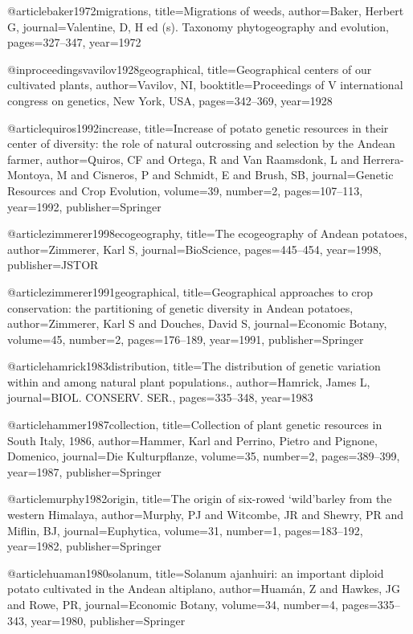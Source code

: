 {@article{baker1972migrations,
  title={Migrations of weeds},
  author={Baker, Herbert G},
  journal={Valentine, D, H ed (s). Taxonomy phytogeography and evolution},
  pages={327--347},
  year={1972}
}

@inproceedings{vavilov1928geographical,
  title={Geographical centers of our cultivated plants},
  author={Vavilov, NI},
  booktitle={Proceedings of V international congress on genetics, New York, USA},
  pages={342--369},
  year={1928}
}

@article{quiros1992increase,
  title={Increase of potato genetic resources in their center of diversity: the role of natural outcrossing and selection by the Andean farmer},
  author={Quiros, CF and Ortega, R and Van Raamsdonk, L and Herrera-Montoya, M and Cisneros, P and Schmidt, E and Brush, SB},
  journal={Genetic Resources and Crop Evolution},
  volume={39},
  number={2},
  pages={107--113},
  year={1992},
  publisher={Springer}
}

@article{zimmerer1998ecogeography,
  title={The ecogeography of Andean potatoes},
  author={Zimmerer, Karl S},
  journal={BioScience},
  pages={445--454},
  year={1998},
  publisher={JSTOR}
}

@article{zimmerer1991geographical,
  title={Geographical approaches to crop conservation: the partitioning of genetic diversity in Andean potatoes},
  author={Zimmerer, Karl S and Douches, David S},
  journal={Economic Botany},
  volume={45},
  number={2},
  pages={176--189},
  year={1991},
  publisher={Springer}
}

@article{hamrick1983distribution,
  title={The distribution of genetic variation within and among natural plant populations.},
  author={Hamrick, James L},
  journal={BIOL. CONSERV. SER.},
  pages={335--348},
  year={1983}
}

@article{hammer1987collection,
  title={Collection of plant genetic resources in South Italy, 1986},
  author={Hammer, Karl and Perrino, Pietro and Pignone, Domenico},
  journal={Die Kulturpflanze},
  volume={35},
  number={2},
  pages={389--399},
  year={1987},
  publisher={Springer}
}

@article{murphy1982origin,
  title={The origin of six-rowed ‘wild’barley from the western Himalaya},
  author={Murphy, PJ and Witcombe, JR and Shewry, PR and Miflin, BJ},
  journal={Euphytica},
  volume={31},
  number={1},
  pages={183--192},
  year={1982},
  publisher={Springer}
}

@article{huaman1980solanum,
  title={Solanum ajanhuiri: an important diploid potato cultivated in the Andean altiplano},
  author={Huam{\'a}n, Z and Hawkes, JG and Rowe, PR},
  journal={Economic Botany},
  volume={34},
  number={4},
  pages={335--343},
  year={1980},
  publisher={Springer}
}

}

